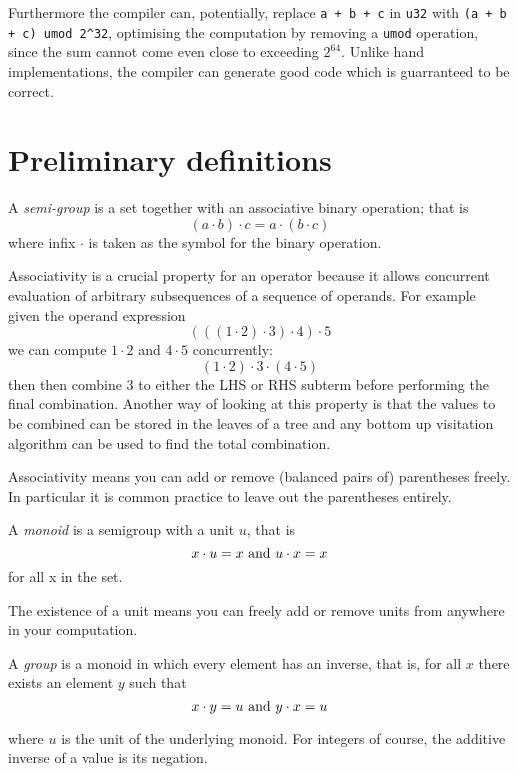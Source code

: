 Furthermore the compiler can, potentially, replace \verb$a + b + c$ in \verb$u32$
with \verb$(a + b + c) umod 2^32$, optimising the computation by removing a \verb$umod$
operation, since the sum cannot come even close to exceeding $2^{64}$. Unlike hand 
implementations, the compiler can generate good code which is guarranteed to be correct.




\section{Preliminary definitions}
\begin{definition}
A {\em semi-group} is a set together with an associative binary operation; that is
$$(a \cdot b)\cdot c = a \cdot (b \cdot c)$$
where infix $\cdot$ is taken as the symbol for the binary operation.
\end{definition}

Associativity is a crucial property for an operator because it allows concurrent
evaluation of arbitrary subsequences of a sequence of operands. For example given
the operand expression 
$$(((1\cdot2)\cdot3)\cdot4)\cdot5$$
we can compute $1\cdot2$ and $4\cdot5$ concurrently:
$$(1\cdot2)\cdot3\cdot(4\cdot5)$$
then then combine 3 to either the LHS or RHS subterm before performing the final combination.
Another way of looking at this property is that the values to be combined can be stored in
the leaves of a tree and any bottom up visitation algorithm can be used to find the total combination.

Associativity means you can add or remove (balanced pairs of) parentheses freely.
In particular it is common practice to leave out the parentheses entirely.

\begin{definition}
A {\em monoid} is a semigroup with a unit $u$, that is
$$x\cdot u = x {\rm \ and\ }u \cdot x = x$$
for all x in the set.
\end{definition}

The existence of a unit means you can freely add or remove units from
anywhere in your computation.

\begin{definition}
A {\em group} is a monoid in which every element has an inverse, that is,
for all $x$ there exists an element $y$ such that
$$x \cdot y = u {\rm\ and\ } y \cdot x = u $$
\end{definition}
where $u$ is the unit of the underlying monoid. For integers of course,
the additive inverse of a value is its negation.

